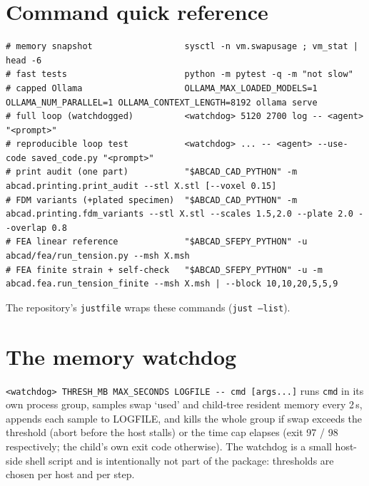 \documentclass[11pt]{article}
\begin{document}
\appendix
\section{Command quick reference}
\begin{lstlisting}
# memory snapshot                  sysctl -n vm.swapusage ; vm_stat | head -6
# fast tests                       python -m pytest -q -m "not slow"
# capped Ollama                    OLLAMA_MAX_LOADED_MODELS=1 OLLAMA_NUM_PARALLEL=1 OLLAMA_CONTEXT_LENGTH=8192 ollama serve
# full loop (watchdogged)          <watchdog> 5120 2700 log -- <agent> "<prompt>"
# reproducible loop test           <watchdog> ... -- <agent> --use-code saved_code.py "<prompt>"
# print audit (one part)           "$ABCAD_CAD_PYTHON" -m abcad.printing.print_audit --stl X.stl [--voxel 0.15]
# FDM variants (+plated specimen)  "$ABCAD_CAD_PYTHON" -m abcad.printing.fdm_variants --stl X.stl --scales 1.5,2.0 --plate 2.0 --overlap 0.8
# FEA linear reference             "$ABCAD_SFEPY_PYTHON" -u abcad/fea/run_tension.py --msh X.msh
# FEA finite strain + self-check   "$ABCAD_SFEPY_PYTHON" -u -m abcad.fea.run_tension_finite --msh X.msh | --block 10,10,20,5,5,9
\end{lstlisting}
The repository's \texttt{justfile} wraps these commands (\texttt{just --list}).

\section{The memory watchdog}\label{app:watchdog}
\texttt{<watchdog> THRESH\_MB MAX\_SECONDS LOGFILE -{}- cmd [args...]} runs \texttt{cmd} in its own
process group, samples swap `used' and child-tree resident memory every 2\,s, appends each sample to
LOGFILE, and kills the whole group if swap exceeds the threshold (abort before the host stalls) or the
time cap elapses (exit 97 / 98 respectively; the child's own exit code otherwise). The watchdog is a
small host-side shell script and is intentionally not part of the package: thresholds are chosen per
host and per step.
\end{document}
